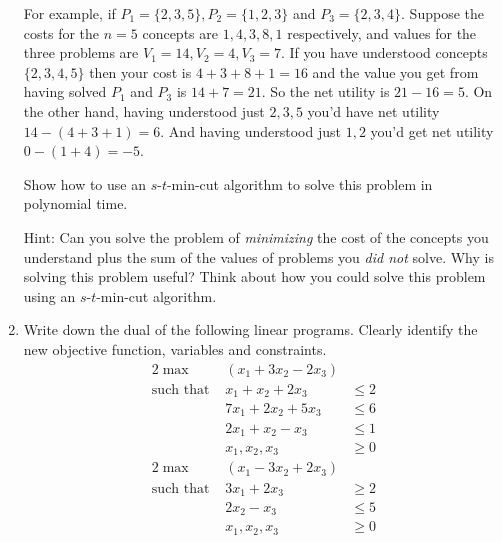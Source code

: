 \documentclass[11pt]{article}
\begin{document}
\begin{enumerate}
For example, if $P_1 = \{2, 3, 5\}, P_2 = \{1, 2, 3\}$ and $P_3 = \{2, 3, 4\}$. Suppose the costs for the $n = 5$ concepts are $1, 4, 3, 8, 1$ respectively, and values for the three problems are $V_1 = 14, V_2 =
4, V_3 = 7$. If you have understood concepts $\{2, 3, 4, 5\}$ then your cost is $4 + 3 + 8 + 1 = 16$ and the value you get from having solved $P_1$ and $P_3$ is $14 + 7 = 21$. So the net utility is $21 - 16 = 5$.
On the other hand, having understood just $2, 3, 5$ you'd have net utility $14 - (4 + 3 + 1) = 6$. And having understood just $1, 2$ you'd get net utility $0 - (1 + 4) = -5$.

Show how to use an $s$-$t$-min-cut algorithm to solve this problem in polynomial time.

Hint: Can you solve the problem of \emph{minimizing} the cost of the concepts you understand plus the sum of the values of problems you \emph{did not} solve. Why is solving this problem useful? Think about how you could solve this problem using an $s$-$t$-min-cut algorithm.

\item Write down the dual of the following linear programs. Clearly identify the new objective function, variables and constraints.
\begin{alignat*}{2}
\max & (x_1 + 3x_2  - 2  x_3) & \\
\textrm{such that } & x_1 + x_2 + 2x_3  & \leq   2\\
& 7x_1 + 2x_2 + 5x_3 &\leq 6 \\
& 2x_1 + x_2 - x_3 & \leq 1\\
& x_1, x_2, x_3 &\geq 0
\end{alignat*}
\begin{alignat*}{2}
\max & (x_1 - 3x_2  +2  x_3) & \\
\textrm{such that } & 3x_1 + 2x_3   & \geq   2\\
& 2x_2 - x_3 &\leq 5 \\
& x_1, x_2, x_3 &\geq 0
\end{alignat*}



\end{enumerate}
\end{document}
